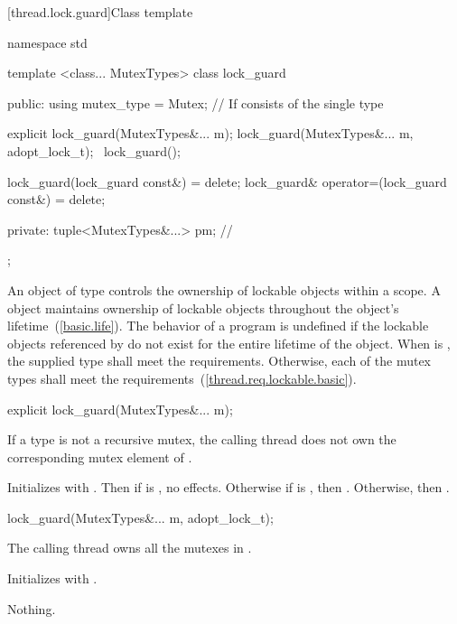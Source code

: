 [thread.lock.guard]{Class template }

\begin{codeblock}
namespace std {
  template <class... MutexTypes>
  class lock_guard {
  public:
    using mutex_type = Mutex;  // If  consists of the single type 

    explicit lock_guard(MutexTypes&... m);
    lock_guard(MutexTypes&... m, adopt_lock_t);
    ~lock_guard();

    lock_guard(lock_guard const&) = delete;
    lock_guard& operator=(lock_guard const&) = delete;

  private:
    tuple<MutexTypes&...> pm; // \expos
  };
}
\end{codeblock}

\pnum
An object of type  controls the ownership of lockable objects
within a scope. A  object maintains ownership of lockable
objects throughout the  object's lifetime~(\ref{basic.life}).
The behavior of a program is undefined if the lockable objects referenced by
 do not exist for the entire lifetime of the 
object.
When  is ,
the supplied  type
shall meet the  requirements.
Otherwise, each of the mutex types
shall meet the  requirements~(\ref{thread.req.lockable.basic}).

%
\begin{itemdecl}
explicit lock_guard(MutexTypes&... m);
\end{itemdecl}

\begin{itemdescr}
\pnum
\precondition If a  type is not a recursive mutex,
the calling thread does not own the corresponding mutex element of .

\pnum
\effects Initializes  with .
Then if  is , no effects.
Otherwise if  is , then .
Otherwise, then .
\end{itemdescr}

%
\begin{itemdecl}
lock_guard(MutexTypes&... m, adopt_lock_t);
\end{itemdecl}

\begin{itemdescr}
\pnum
\precondition The calling thread owns all the mutexes in .

\pnum
\effects Initializes  with .

\pnum
\throws Nothing.
\end{itemdescr}

